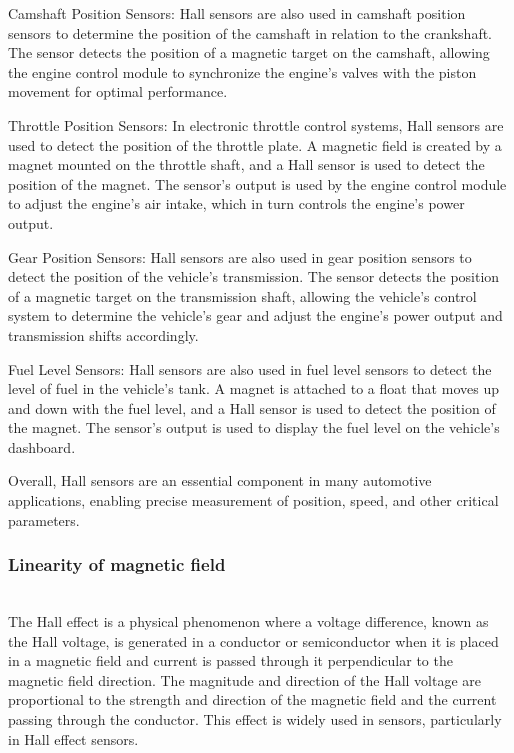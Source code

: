 \documentclass[11pt]{article}
\begin{document}
Camshaft Position Sensors: Hall sensors are also used in camshaft position sensors to determine the position of the camshaft in relation to the crankshaft. The sensor detects the position of a magnetic target on the camshaft, allowing the engine control module to synchronize the engine's valves with the piston movement for optimal performance.

Throttle Position Sensors: In electronic throttle control systems, Hall sensors are used to detect the position of the throttle plate. A magnetic field is created by a magnet mounted on the throttle shaft, and a Hall sensor is used to detect the position of the magnet. The sensor's output is used by the engine control module to adjust the engine's air intake, which in turn controls the engine's power output.

Gear Position Sensors: Hall sensors are also used in gear position sensors to detect the position of the vehicle's transmission. The sensor detects the position of a magnetic target on the transmission shaft, allowing the vehicle's control system to determine the vehicle's gear and adjust the engine's power output and transmission shifts accordingly.

Fuel Level Sensors: Hall sensors are also used in fuel level sensors to detect the level of fuel in the vehicle's tank. A magnet is attached to a float that moves up and down with the fuel level, and a Hall sensor is used to detect the position of the magnet. The sensor's output is used to display the fuel level on the vehicle's dashboard.

Overall, Hall sensors are an essential component in many automotive applications, enabling precise measurement of position, speed, and other critical parameters.

\subsubsection{Linearity of magnetic field}
\indent \\The Hall effect is a physical phenomenon where a voltage difference, known as the Hall voltage, is generated in a conductor or semiconductor when it is placed in a magnetic field and current is passed through it perpendicular to the magnetic field direction. The magnitude and direction of the Hall voltage are proportional to the strength and direction of the magnetic field and the current passing through the conductor. This effect is widely used in sensors, particularly in Hall effect sensors.
\end{document}
